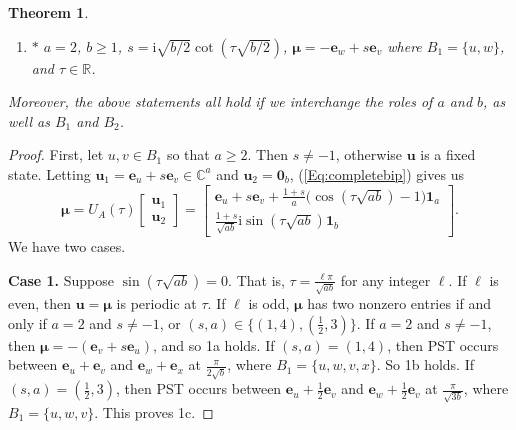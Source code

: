 \documentclass{article}
\numberwithin{equation}{section}
\newtheorem{theorem}[lemma]{Theorem}
\newcommand{\zero}{\mathbf 0}
\newcommand{\uno}{\mathbf 1}
\newcommand{\be}{\mathbf e}
\newcommand{\bu}{\mathbf u}
\newcommand{\bmu}{{\boldsymbol{\mu}}}
\def\C{\mathbb{C}}
\def\R{\mathbb{R}}
\def\ii{\mathrm{i}}
\begin{document}
{\begin{theorem}
\begin{enumerate}
\begin{enumerate}
\item $*$ $a=2$, $b\geq 1$, $s=\ii \sqrt{b/2} \cot(\tau\sqrt{b/2})$, $\bmu=-\be_w+s\be_v$ where $B_1=\{u,w\}$, and $\tau\in\R$.
\end{enumerate}
\end{enumerate}
Moreover, the above statements all hold if we interchange the roles of $a$ and $b$, as well as $B_1$ and $B_2$.
\end{theorem}

\begin{proof}
First, let $u,v\in B_1$ so that $a\geq 2$. Then $s\neq -1$, otherwise $\bu$ is a fixed state. Letting $\bu_1=\be_u+s\be_v\in\C^a$ and $\bu_2=\zero_b$, (\ref{Eq:completebip}) gives us
\begin{equation*}
\bmu=U_A(\tau)\begin{bmatrix}
\bu_1\\ \bu_2\end{bmatrix}=\begin{bmatrix}
\be_u+s\be_v+\frac{1+s}{a}\big(\cos( \tau\sqrt{ab})-1\big)\uno_a \\ \frac{1+s}{\sqrt{ab}}\ii\sin( \tau\sqrt{ab})\uno_b
\end{bmatrix}. 
\end{equation*}
We have two cases. 

\noindent \textbf{Case 1.} Suppose $\sin( \tau\sqrt{ab})=0$. That is, $\tau=\frac{\ell\pi}{\sqrt{ab}}$ for any integer $\ell$. If $\ell$ is even, then $\bu=\bmu$ is periodic at $\tau$. If $\ell$ is odd, 
$\bmu$ has two nonzero entries if and only if $a=2$ and $s\neq -1$, or $(s,a)\in\{(1,4),(\frac{1}{2},3)\}$. If $a=2$ and $s\neq -1$, then $\bmu=-(\be_v+s\be_u)$, and so 1a holds. If $(s,a)=(1,4)$, then PST occurs between $\be_u+\be_v$ and $\be_w+\be_x$ at $\frac{\pi}{2\sqrt{b}}$, where $B_1=\{u,w,v,x\}$. So 1b holds. If $(s,a)=(\frac{1}{2},3)$, then PST occurs between $\be_u+\frac{1}{2}\be_v$ and $\be_w+\frac{1}{2}\be_v$ at $\frac{\pi}{\sqrt{3b}}$, where $B_1=\{u,w,v\}$. This proves 1c. 


\end{proof}}
\end{document}
